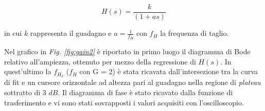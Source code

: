 \documentclass[journal]{IEEEtran}
\begin{document}
\begin{equation}
    H(s)=\frac{k}{(1+as)}
\end{equation}

in cui $k$ rappresenta il guadagno e $a = \frac{1}{f_H}$ con $f_H$ la frequenza di taglio. 

Nel grafico in \textit{Fig. \ref{fig:gain2}} è riportato in primo luogo il diagramma di Bode relativo all'ampiezza, ottenuto per mezzo della regressione di $H(s)$. In quest'ultimo la $f_{H_2}$ ($f_{H}$ con G = 2) è stata ricavata dall'intersezione tra la curva di fit e un cursore orizzontale ad altezza pari al guadagno nella regione di \textit{plateau} sottratto di $3$ $dB$. Il diagramma di fase è stato ricavato dalla funzione di trasferimento e vi sono stati sovrapposti i valori acquisiti con l'oscilloscopio. 
\end{document}
